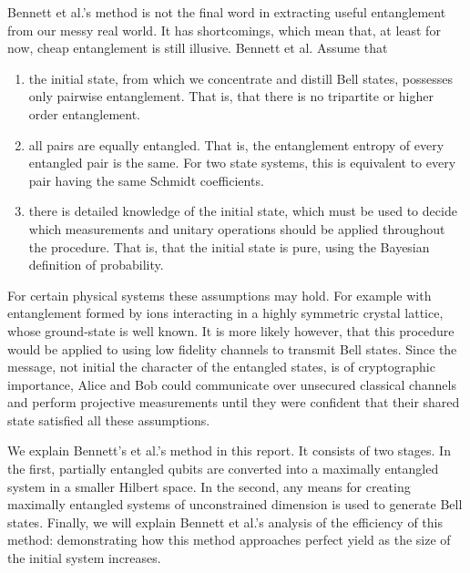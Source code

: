 Bennett et al.'s method is not the final word in extracting useful entanglement from our messy real world.
It has shortcomings, which mean that, at least for now, cheap entanglement is still illusive. 
Bennett et al. Assume that
\begin{enumerate}
	\item the initial state, from which we concentrate and distill Bell states, possesses only pairwise entanglement. That is, that there is no tripartite or higher order entanglement.
	\item all pairs are equally entangled. That is, the entanglement entropy of every entangled pair is the same. For two state systems, this is equivalent to every pair having the same Schmidt coefficients.
	\item there is detailed knowledge of the initial state, which must be used to decide which measurements and unitary operations should be applied throughout the procedure. That is, that the initial state is pure, using the Bayesian definition of probability.
\end{enumerate}

For certain physical systems these assumptions may hold. 
For example with entanglement formed by ions interacting in a highly symmetric crystal lattice, whose ground-state is well known.
It is more likely however, that this procedure would be applied to using low fidelity channels to transmit Bell states.
Since the message, not initial the character of the entangled states, is of cryptographic importance, Alice and Bob could communicate over unsecured classical channels and perform projective measurements until they were confident that their shared state satisfied all these assumptions.

We explain Bennett's et al.'s method in this report.
It consists of two stages.
In the first, partially entangled qubits are converted into a maximally entangled system in a smaller Hilbert space.
In the second, any means for creating maximally entangled systems of unconstrained dimension is used to generate Bell states.
Finally, we will explain Bennett et al.'s analysis of the efficiency of this method: demonstrating how this method approaches perfect yield as the size of the initial system increases.
